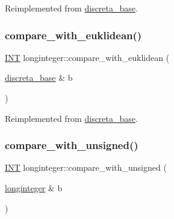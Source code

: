 Reimplemented from \mbox{\hyperlink{classdiscreta__base_a3818444c4301d0b7ed47c3b850ea6c60}{discreta\+\_\+base}}.

\mbox{\label{classlonginteger_a71b27b9c767c0da8964151323810f315}} 
\subsubsection{\texorpdfstring{compare\+\_\+with\+\_\+euklidean()}{compare\_with\_euklidean()}}
{\footnotesize\ttfamily \mbox{\hyperlink{galois_8h_a09fddde158a3a20bd2dcadb609de11dc}{I\+NT}} longinteger\+::compare\+\_\+with\+\_\+euklidean (\begin{DoxyParamCaption}\item[{\mbox{\hyperlink{classdiscreta__base}{discreta\+\_\+base}} \&}]{b }\end{DoxyParamCaption})\hspace{0.3cm}{\ttfamily [virtual]}}



Reimplemented from \mbox{\hyperlink{classdiscreta__base_a9d3091feb2fbc69359c2a45f11ceec9e}{discreta\+\_\+base}}.

\mbox{\label{classlonginteger_ab08011cadec55cf084dbffcb74bb4991}} 
\subsubsection{\texorpdfstring{compare\+\_\+with\+\_\+unsigned()}{compare\_with\_unsigned()}}
{\footnotesize\ttfamily \mbox{\hyperlink{galois_8h_a09fddde158a3a20bd2dcadb609de11dc}{I\+NT}} longinteger\+::compare\+\_\+with\+\_\+unsigned (\begin{DoxyParamCaption}\item[{\mbox{\hyperlink{classlonginteger}{longinteger}} \&}]{b }\end{DoxyParamCaption})}

\mbox{\label{classlonginteger_ae894d5c96d74d0c19a09527956a14493}} 
